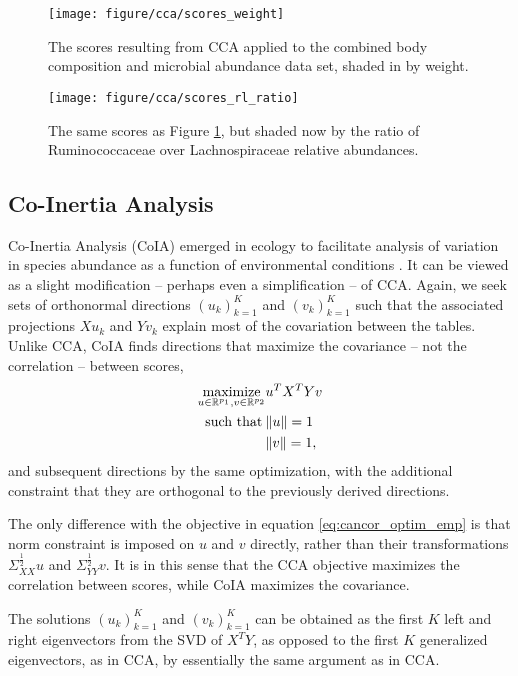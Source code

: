 \documentclass{article}
\begin{document}
\begin{figure}[ht]
  \centering
  \texttt{[image: figure/cca/scores\_weight]}
  \caption{The scores resulting from CCA applied to the combined body
    composition and microbial abundance data set, shaded in by
    weight.\label{fig:cca_scores_weight} }
\end{figure}

\begin{figure}[ht]
  \centering
  \texttt{[image: figure/cca/scores\_rl\_ratio]}
  \caption{The same scores as Figure \ref{fig:cca_scores_weight}, but shaded now by
    the ratio of Ruminococcaceae over Lachnospiraceae relative
    abundances. \label{fig:cca_scores_rl_ratio} }
\end{figure}

\subsection{Co-Inertia Analysis}

Co-Inertia Analysis (CoIA) emerged in ecology to facilitate analysis of
variation in species abundance as a function of environmental conditions
\cite{doledec1994co}. It can be viewed as a slight modification -- perhaps even
a simplification -- of CCA. Again, we seek sets of orthonormal directions
$\left(u_{k}\right)_{k = 1}^{K}$ and $\left(v_{k}\right)_{k = 1}^{K}$ such that
the associated projections $Xu_{k}$ and $Yv_{k}$ explain most of the covariation
between the tables. Unlike CCA, CoIA finds directions that maximize the
covariance -- not the correlation -- between scores,
\begin{align}
\mathop\mathrm{maximize}_{u \in \mathbb{R}^{p_{1}}, v \in \mathbb{R}^{p_{2}}} &u^{T}X^{T}Yv \\
\text{ such that}\medspace &\|u\| = 1\\
&\|v\| = 1,
\end{align}
and subsequent directions by the same optimization, with the
additional constraint that they are orthogonal to the previously
derived directions.

The only difference with the objective in equation \ref{eq:cancor_optim_emp} is
that norm constraint is imposed on $u$ and $v$ directly, rather than their
transformations $\Sigma_{XX}^{\frac{1}{2}}u$ and $\Sigma_{YY}^{\frac{1}{2}}v$.
It is in this sense that the CCA objective maximizes the correlation between
scores, while CoIA maximizes the covariance.

The solutions $\left(u_{k}\right)_{k = 1}^{K}$ and $\left(v_{k}\right)_{k =
  1}^{K}$ can be obtained as the first $K$ left and right eigenvectors from the
SVD of $X^{T}Y$, as opposed to the first $K$ generalized eigenvectors, as in
CCA, by essentially the same argument as in CCA.
\end{document}
